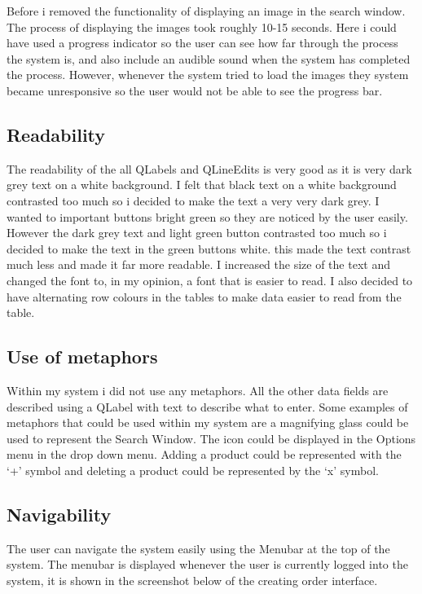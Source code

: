 Before i removed the functionality of displaying an image in the search window. The process of displaying the images took roughly 10-15 seconds. Here i could have used a progress indicator so the user can see how far through the process the system is, and also include an audible sound when the system has completed the process. However, whenever the system tried to load the images they system became unresponsive so the user would not be able to see the progress bar.

\subsection{Readability}

The readability of the all QLabels and QLineEdits is very good as it is very dark grey text on a white background. I felt that black text on a white background contrasted too much so i decided to make the text a very very dark grey. I wanted to important buttons bright green so they are noticed by the user easily. However the dark grey text and light green button contrasted too much so i decided to make the text in the green buttons white. this made the text contrast much less and made it far more readable. I increased the size of the text and changed the font to, in my opinion, a font that is easier to read. I also decided to have alternating row colours in the tables to make data easier to read from the table.


\subsection{Use of metaphors}

Within my system i did not use any metaphors. All the other data fields are described using a QLabel with text to describe what to enter. Some examples of metaphors that could be used within my system are a magnifying glass could be used to represent the Search Window. The icon could be displayed in the Options menu in the drop down menu. Adding a product could be represented with the `+' symbol and deleting a product could be represented by the `x' symbol. 

\subsection{Navigability} 

The user can navigate the system easily using the Menubar at the top of the system. The menubar is displayed whenever the user is currently logged into the system, it is shown in the screenshot below of the creating order interface.


